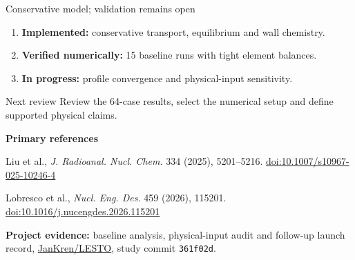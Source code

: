 \documentclass[aspectratio=169,10pt]{beamer}
\begin{document}
\begin{frame}[t]{Conservative model; validation remains open}
  \begin{enumerate}
    \item \textbf{Implemented:} conservative transport, equilibrium and wall chemistry.
    \item \textbf{Verified numerically:} 15 baseline runs with tight element balances.
    \item \textbf{In progress:} profile convergence and physical-input sensitivity.
  \end{enumerate}
  \vspace{0.3em}
  \begin{block}{Next review}
    Review the 64-case results, select the numerical setup and define supported physical claims.
  \end{block}
  {\fontsize{7}{8.5}\selectfont
    \textbf{Primary references}\par
    Liu et al., \emph{J. Radioanal. Nucl. Chem.} 334 (2025), 5201--5216.\quad
    \href{https://doi.org/10.1007/s10967-025-10246-4}{doi:10.1007/s10967-025-10246-4}\par
    Lobresco et al., \emph{Nucl. Eng. Des.} 459 (2026), 115201.\quad
    \href{https://doi.org/10.1016/j.nucengdes.2026.115201}{doi:10.1016/j.nucengdes.2026.115201}\par
    \textbf{Project evidence:} baseline analysis, physical-input audit and follow-up launch record,\quad
    \href{https://github.com/JanKren/LESTO/tree/phase-change-rebased}{JanKren/LESTO}, study commit \texttt{361f02d}.
  }
\end{frame}
\end{document}

